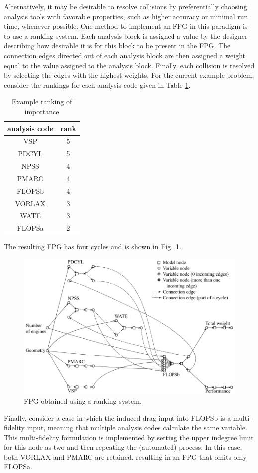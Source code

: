 	Alternatively, it may be desirable to resolve collisions by preferentially choosing analysis tools with favorable properties, such as higher accuracy or minimal run time, whenever possible.
	One method to implement an FPG in this paradigm is to use a ranking system. Each analysis block is assigned a value by the designer describing how desirable it is for this block to be present in the FPG. The connection edges directed out of each analysis block are then assigned a weight equal to the value assigned to the analysis block. Finally, each collision is resolved by selecting the edges with the highest weights.
For the current example problem, consider the rankings for each analysis code given in Table \ref{t:rankings}.
	\begin{table}[htbp]
	  \centering
	  \caption{Example ranking of importance}
		\begin{tabular}{cc}
		\toprule
		analysis code & rank \\
		\midrule
		VSP   & 5 \\
		PDCYL & 5 \\
		NPSS  & 4 \\
		PMARC & 4 \\
		FLOPSb & 4 \\
		VORLAX & 3 \\
		WATE  & 3 \\
		FLOPSa & 2 \\
		\bottomrule
		\end{tabular}%
	  \label{t:rankings}%
	\end{table}%
	The resulting FPG has four cycles and is shown in Fig.~\ref{f:FPG highest rank}. 
	\begin{figure}[htb!]
	  \begin{center}
		\includegraphics[width=6in]{images/FPG_edit_ranking}
	  \end{center}
	  \caption{FPG obtained using a ranking system.}
	\label{f:FPG highest rank}
	\end{figure}

	Finally, consider a case in which 
the induced drag input into FLOPSb is a multi-fidelity input, meaning that 
 multiple analysis codes calculate the same variable. 
	This multi-fidelity formulation is implemented by setting the upper indegree limit for this node as two and then repeating the (automated) process. 
	In this case, both VORLAX and PMARC are retained, resulting in an FPG that omits only FLOPSa.

